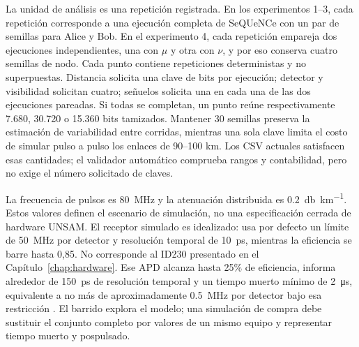 La unidad de análisis es una repetición registrada. En los experimentos 1--3, cada repetición corresponde a una ejecución completa de SeQUeNCe con un par de semillas para Alice y Bob. En el experimento 4, cada repetición empareja dos ejecuciones independientes, una con \(\mu\) y otra con \(\nu\), y por eso conserva cuatro semillas de nodo. Cada punto contiene \PThreeRepetitions{} repeticiones deterministas y no superpuestas. Distancia solicita una clave de \PThreeKeyBits{} bits por ejecución; detector y visibilidad solicitan cuatro; señuelos solicita una en cada una de las dos ejecuciones pareadas. Si todas se completan, un punto reúne respectivamente 7.680, 30.720 o 15.360 bits tamizados. Mantener 30 semillas preserva la estimación de variabilidad entre corridas, mientras una sola clave limita el costo de simular pulso a pulso los enlaces de 90--100 km. Los CSV actuales satisfacen esas cantidades; el validador automático comprueba rangos y contabilidad, pero no exige el número solicitado de claves.

La frecuencia de pulsos es \SI{80}{\mega\hertz} y la atenuación distribuida es \SI{0.2}{\decibel\per\kilo\meter}. Estos valores definen el escenario de simulación, no una especificación cerrada de hardware UNSAM. El receptor simulado es idealizado: usa por defecto un límite de \SI{50}{\mega\hertz} por detector y resolución temporal de \SI{10}{\pico\second}, mientras la eficiencia se barre hasta 0,85. No corresponde al ID230 presentado en el Capítulo~\ref{chap:hardware}. Ese APD alcanza hasta 25\% de eficiencia, informa alrededor de \SI{150}{\pico\second} de resolución temporal y un tiempo muerto mínimo de \SI{2}{\micro\second}, equivalente a no más de aproximadamente \SI{0.5}{\mega\hertz} por detector bajo esa restricción \cite{idqID230}. El barrido explora el modelo; una simulación de compra debe sustituir el conjunto completo por valores de un mismo equipo y representar tiempo muerto y pospulsado.

